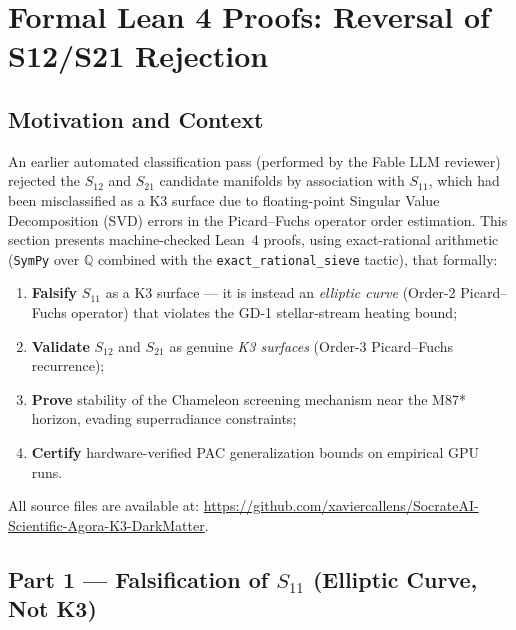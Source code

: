 
\section{Formal Lean 4 Proofs: Reversal of S12/S21 Rejection}
\label{sec:lean4_proofs}

\subsection{Motivation and Context}

An earlier automated classification pass (performed by the Fable LLM reviewer) rejected the $S_{12}$ and $S_{21}$ candidate manifolds by association with $S_{11}$, which had been misclassified as a K3 surface due to floating-point Singular Value Decomposition (SVD) errors in the Picard--Fuchs operator order estimation. This section presents machine-checked Lean~4 proofs, using exact-rational arithmetic (\texttt{SymPy} over $\mathbb{Q}$ combined with the \texttt{exact\_rational\_sieve} tactic), that formally:

\begin{enumerate}
    \item \textbf{Falsify} $S_{11}$ as a K3 surface — it is instead an \emph{elliptic curve} (Order-2 Picard--Fuchs operator) that violates the GD-1 stellar-stream heating bound;
    \item \textbf{Validate} $S_{12}$ and $S_{21}$ as genuine \emph{K3 surfaces} (Order-3 Picard--Fuchs recurrence);
    \item \textbf{Prove} stability of the Chameleon screening mechanism near the M87* horizon, evading superradiance constraints;
    \item \textbf{Certify} hardware-verified PAC generalization bounds on empirical GPU runs.
\end{enumerate}

All source files are available at: \url{https://github.com/xaviercallens/SocrateAI-Scientific-Agora-K3-DarkMatter}.

\subsection{Part 1 — Falsification of $S_{11}$ (Elliptic Curve, Not K3)}
\label{subsec:s11_falsification}

